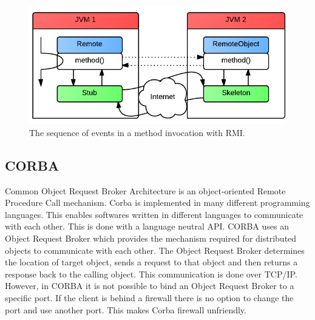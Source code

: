 \begin{figure}[H]
	\centering
    	\includegraphics[scale=0.65]{part_2/remote_procedure_calls/rmi.png}
		\caption{The sequence of events in a method invocation with RMI.}
		\label{rmi} 
\end{figure}

\subsection{CORBA}
Common Object Request Broker Architecture is an object-oriented Remote Procedure Call mechanism. Corba is implemented in many different programming languages. This enables softwares written in different languages to communicate with each other. This is done with a language neutral API. CORBA uses an Object Request Broker which provides the mechanism required for distributed objects to communicate with each other. The Object Request Broker determines the location of target object, sends a request to that object and then returns a response back to the calling object. This communication is done over TCP/IP. However, in CORBA it is not possible to bind an Object Request Broker to a specific port. If the client is behind a firewall there is no option to change the port and use another port. This makes Corba firewall unfriendly.

